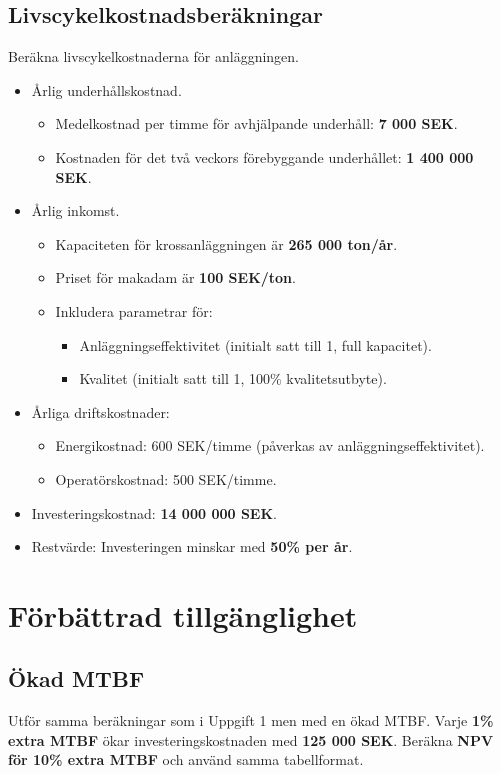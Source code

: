 \documentclass[a4paper,12pt]{exam}
\begin{document}
\subsection{Livscykelkostnadsberäkningar}
Beräkna livscykelkostnaderna för anläggningen.
\begin{itemize}
    \item Årlig underhållskostnad.
    \begin{itemize}
    \item Medelkostnad per timme för avhjälpande underhåll: \textbf{7 000 SEK}. 
    \item Kostnaden för det två veckors förebyggande underhållet: \textbf{1 400 000 SEK}. 
    \end{itemize}    
    \item Årlig inkomst. 
    \begin{itemize}
    \item Kapaciteten för krossanläggningen är \textbf{265 000 ton/år}.
    \item Priset för makadam är \textbf{100 SEK/ton}.
    \item Inkludera parametrar för: 
    \begin{itemize}
        \item Anläggningseffektivitet (initialt satt till 1, full kapacitet).
        \item Kvalitet (initialt satt till 1, 100\% kvalitetsutbyte).
    \end{itemize}
    \end{itemize}
    \item Årliga driftskostnader:
    \begin{itemize}
        \item Energikostnad: 600 SEK/timme (påverkas av anläggningseffektivitet).
        \item Operatörskostnad: 500 SEK/timme.
    \end{itemize}
    \item Investeringskostnad: \textbf{14 000 000 SEK}.
    \item Restvärde: Investeringen minskar med \textbf{50\% per år}.
\end{itemize}

\section{Förbättrad tillgänglighet}
\subsection{Ökad MTBF}
Utför samma beräkningar som i Uppgift 1 men med en ökad MTBF. Varje \textbf{1\% extra MTBF} ökar investeringskostnaden med \textbf{125 000 SEK}. Beräkna \textbf{NPV för 10\% extra MTBF} och använd samma tabellformat.
\end{document}
